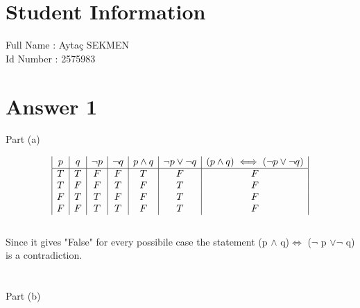 \documentclass[12pt]{article}
\begin{document}
\section*{Student Information } 
Full Name :  Aytaç SEKMEN \\
Id Number : 2575983 \\

\section*{Answer 1}
Part (a)

\begin{displaymath}
\begin{array}{|c | c | c | c | c |c|c|}

p & q & \neg p & \neg q & p \land q & \neg p \lor \neg q &  (p \land q)\iff (\neg p \lor \neg q)\\
\hline 
T & T & F& F&T&F&F\\
T & F & F&T&F&T&F\\
F & T & T&F&F&T&F\\
F & F & T&T&F&T&F\\
\end{array}
\end{displaymath}
\\

Since it gives "False" for every possibile case the statement (p $\land$ q)$\iff$ ($\neg$ p $\lor \neg$ q) is a contradiction.\\\\\\

Part (b)
\end{document}
